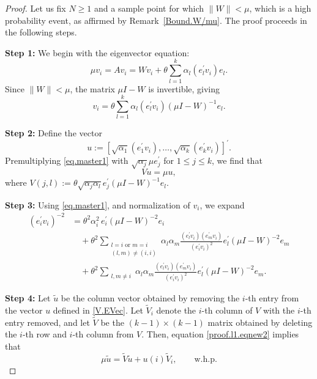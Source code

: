 \documentclass[10pt,a4paper]{amsart}
\begin{document}
\begin{proof}
Let us fix $N\ge1$ and a sample point for which $\|W\|<\mu$, which is a high probability event, as affirmed by Remark~\ref{Bound.W/mu}. The proof proceeds in the following steps.

\textbf{Step 1:}
We begin with the eigenvector equation:
\begin{equation}\label{proof.l1.eq2}
\mu v_i = A v_i = W v_i + \theta \sum_{l=1}^k \alpha_l (e_l^\prime v_i) e_l.
\end{equation}
Since $\|W\|<\mu$, the matrix $\mu I - W$ is invertible, giving
\begin{equation}\label{eq.master1}
v_i = \theta \sum_{l=1}^k \alpha_l (e_l^\prime v_i)(\mu I - W)^{-1} e_l.
\end{equation}

\textbf{Step 2:}
Define the vector
\begin{equation}\label{V.EVec}
u := [\sqrt{\alpha_1}(e_1^\prime v_i), \ldots, \sqrt{\alpha_k}(e_k^\prime v_i)]^\prime.
\end{equation}
Premultiplying \eqref{eq.master1} with $\sqrt{\alpha_j} \mu e_j^\prime$ for $1 \le j \le k$, we find that
\begin{equation}\label{proof.l1.eqnew2}
V u = \mu u,
\end{equation}
where $V(j,l) := \theta \sqrt{\alpha_j \alpha_l} e_j^\prime (\mu I - W)^{-1} e_l$.

\textbf{Step 3:}
Using \eqref{eq.master1}, and normalization of \(v_i\), we expand
\begin{align}
(e_i^\prime v_i)^{-2} &= \theta^2 \alpha_i^2\, e_i^\prime (\mu I - W)^{-2} e_i \label{eq.master2} \\
&\quad + \theta^2 \sum_{\substack{l=i \text{ or } m=i \\ (l,m)\ne(i,i)}} \alpha_l \alpha_m \frac{(e_l^\prime v_i)(e_m^\prime v_i)}{(e_i^\prime v_i)^2} e_l^\prime (\mu I - W)^{-2} e_m \nonumber \\
&\quad + \theta^2 \sum_{\substack{l,m \ne i}} \alpha_l \alpha_m \frac{(e_l^\prime v_i)(e_m^\prime v_i)}{(e_i^\prime v_i)^2} e_l^\prime (\mu I - W)^{-2} e_m. \nonumber
\end{align}

\textbf{Step 4:}
Let $\tilde u$ be the column vector obtained by removing the $i$-th entry from the vector $u$ defined in \eqref{V.EVec}. Let $\tilde V_i$ denote the $i$-th column of $V$ with the $i$-th entry removed, and let $\tilde V$ be the $(k-1) \times (k-1)$ matrix obtained by deleting the $i$-th row and $i$-th column from $V$. Then, equation \eqref{proof.l1.eqnew2} implies that
\begin{equation}\label{Vtruncated1}
\mu \tilde u = \tilde V \tilde u + u(i)\tilde V_i, \qquad \text{w.h.p.}
\end{equation}


\end{proof}
\end{document}
